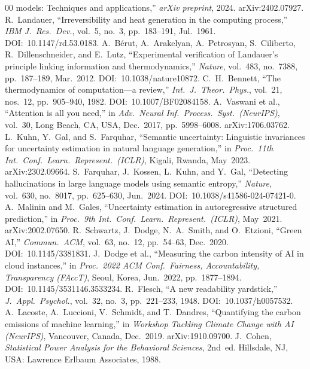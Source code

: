 \documentclass[conference]{IEEEtran}
\begin{document}
\begin{thebibliography}{00}
models: Techniques and applications,''
\textit{arXiv preprint}, 2024.
arXiv:2402.07927.
R.~Landauer,
``Irreversibility and heat generation in the computing process,''
\textit{IBM J.~Res.\ Dev.}, vol.~5, no.~3,
pp.~183--191, Jul.~1961.
DOI:~10.1147/rd.53.0183.
A.~B\'erut, A.~Arakelyan, A.~Petrosyan, S.~Ciliberto,
R.~Dillenschneider, and E.~Lutz,
``Experimental verification of Landauer's principle linking
information and thermodynamics,''
\textit{Nature}, vol.~483, no.~7388, pp.~187--189, Mar.~2012.
DOI:~10.1038/nature10872.
C.~H.~Bennett,
``The thermodynamics of computation---a review,''
\textit{Int.~J.~Theor.\ Phys.}, vol.~21, nos.~12,
pp.~905--940, 1982.
DOI:~10.1007/BF02084158.
A.~Vaswani et al.,
``Attention is all you need,''
in \textit{Adv.\ Neural Inf.\ Process.\ Syst.\ (NeurIPS)},
vol.~30, Long Beach, CA, USA, Dec.~2017, pp.~5998--6008.
arXiv:1706.03762.
L.~Kuhn, Y.~Gal, and S.~Farquhar,
``Semantic uncertainty: Linguistic invariances for uncertainty
estimation in natural language generation,''
in \textit{Proc.\ 11th Int.\ Conf.\ Learn.\ Represent.\ (ICLR)},
Kigali, Rwanda, May~2023.
arXiv:2302.09664.
S.~Farquhar, J.~Kossen, L.~Kuhn, and Y.~Gal,
``Detecting hallucinations in large language models using
semantic entropy,''
\textit{Nature}, vol.~630, no.~8017, pp.~625--630, Jun.~2024.
DOI:~10.1038/s41586-024-07421-0.
A.~Malinin and M.~Gales,
``Uncertainty estimation in autoregressive structured
prediction,''
in \textit{Proc.\ 9th Int.\ Conf.\ Learn.\ Represent.\ (ICLR)},
May~2021.
arXiv:2002.07650.
R.~Schwartz, J.~Dodge, N.~A.~Smith, and O.~Etzioni,
``Green AI,''
\textit{Commun.\ ACM}, vol.~63, no.~12, pp.~54--63, Dec.~2020.
DOI:~10.1145/3381831.
J.~Dodge et al.,
``Measuring the carbon intensity of AI in cloud instances,''
in \textit{Proc.\ 2022 ACM Conf.\ Fairness, Accountability,
Transparency (FAccT)}, Seoul, Korea, Jun.~2022,
pp.~1877--1894.
DOI:~10.1145/3531146.3533234.
R.~Flesch,
``A new readability yardstick,''
\textit{J.~Appl.\ Psychol.}, vol.~32, no.~3, pp.~221--233,
1948.
DOI:~10.1037/h0057532.
A.~Lacoste, A.~Luccioni, V.~Schmidt, and T.~Dandres,
``Quantifying the carbon emissions of machine learning,''
in \textit{Workshop Tackling Climate Change with AI (NeurIPS)},
Vancouver, Canada, Dec.~2019.
arXiv:1910.09700.
J.~Cohen,
\textit{Statistical Power Analysis for the Behavioral Sciences},
2nd~ed. Hillsdale, NJ, USA: Lawrence Erlbaum Associates, 1988.
\end{thebibliography}
\end{document}
